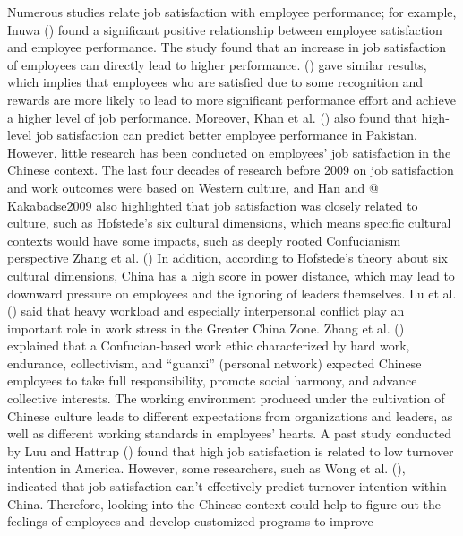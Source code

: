 \documentclass[
  man,
  longtable,
  nolmodern,
  notxfonts,
  notimes,
  colorlinks=true,linkcolor=blue,citecolor=blue,urlcolor=blue]{apa7}
\begin{document}
Numerous studies relate job satisfaction with employee performance; for
example, Inuwa () found a significant
positive relationship between employee satisfaction and employee
performance. The study found that an increase in job satisfaction of
employees can directly lead to higher performance.
() gave similar
results, which implies that employees who are satisfied due to some
recognition and rewards are more likely to lead to more significant
performance effort and achieve a higher level of job performance.
Moreover, Khan et al. () also found that
high-level job satisfaction can predict better employee performance in
Pakistan. However, little research has been conducted on employees' job
satisfaction in the Chinese context. The last four decades of research
before 2009 on job satisfaction and work outcomes were based on Western
culture, and Han and @ Kakabadse2009 also highlighted that job
satisfaction was closely related to culture, such as Hofstede's six
cultural dimensions, which means specific cultural contexts would have
some impacts, such as deeply rooted Confucianism perspective Zhang et
al. () In addition, according to
Hofstede's theory about six cultural dimensions, China has a high score
in power distance, which may lead to downward pressure on employees and
the ignoring of leaders themselves. Lu et al.
() said that heavy workload and especially
interpersonal conflict play an important role in work stress in the
Greater China Zone. Zhang et al.
() explained that a
Confucian-based work ethic characterized by hard work, endurance,
collectivism, and ``guanxi'' (personal network) expected Chinese
employees to take full responsibility, promote social harmony, and
advance collective interests. The working environment produced under the
cultivation of Chinese culture leads to different expectations from
organizations and leaders, as well as different working standards in
employees' hearts. A past study conducted by Luu and Hattrup
() found that high job satisfaction is
related to low turnover intention in America. However, some researchers,
such as Wong et al. (), indicated that job
satisfaction can't effectively predict turnover intention within China.
Therefore, looking into the Chinese context could help to figure out the
feelings of employees and develop customized programs to improve
\end{document}
